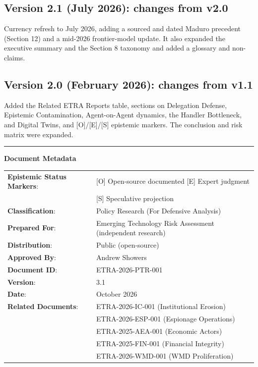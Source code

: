 \documentclass[11pt,letterpaper]{article}
\makeatletter
\newcommand{\etraneed}[1]{\par\if@nobreak\else\penalty\z@\ifdim\pagegoal<\maxdimen\ifdim\dimexpr\pagegoal-\pagetotal\relax<\dimexpr#1\relax\newpage\fi\fi\fi}
\makeatother
\begin{document}
\subsection*{Version 2.1 (July 2026): changes from v2.0}

Currency refresh to July 2026, adding a sourced and dated Maduro precedent (Section 12) and a mid-2026 frontier-model update. It also expanded the executive summary and the Section 8 taxonomy and added a glossary and non-claims.

\subsection*{Version 2.0 (February 2026): changes from v1.1}

Added the Related ETRA Reports table, sections on Delegation Defense, Epistemic Contamination, Agent-on-Agent dynamics, the Handler Bottleneck, and Digital Twins, and [O]/[E]/[S] epistemic markers. The conclusion and risk matrix were expanded.


\etraneed{20\baselineskip}
\begin{center}
\rule{0.6\textwidth}{0.5pt}
\end{center}

\vspace{0.5cm}

\begin{center}
\small\textbf{Document Metadata}

\vspace{0.5em}

\begin{tabular}{ll}
\textbf{Epistemic Status Markers}: & [O] Open-source documented \textbar{} [E] Expert judgment \\
& [S] Speculative projection \\
\textbf{Classification}: & Policy Research (For Defensive Analysis) \\
\textbf{Prepared For}: & Emerging Technology Risk Assessment (independent research) \\
\textbf{Distribution}: & Public (open-source) \\
\textbf{Approved By}: & Andrew Showers \\
\textbf{Document ID}: & ETRA-2026-PTR-001 \\
\textbf{Version}: & 3.1 \\
\textbf{Date}: & October 2026 \\
\textbf{Related Documents}: & ETRA-2026-IC-001 (Institutional Erosion) \\
& ETRA-2026-ESP-001 (Espionage Operations) \\
& ETRA-2025-AEA-001 (Economic Actors) \\
& ETRA-2025-FIN-001 (Financial Integrity) \\
& ETRA-2026-WMD-001 (WMD Proliferation) \\
\end{tabular}
\end{center}
\end{document}
